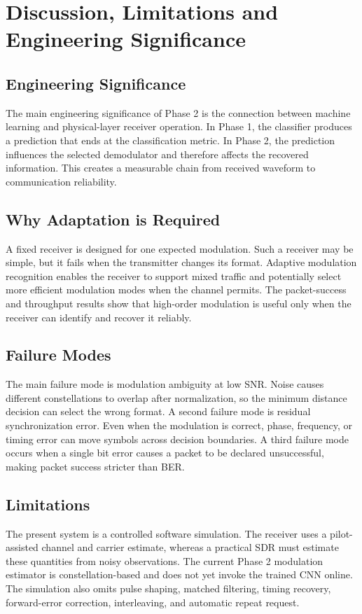 \chapter{Discussion, Limitations and Engineering Significance}

\section{Engineering Significance}
The main engineering significance of Phase 2 is the connection between
machine learning and physical-layer receiver operation. In Phase 1, the
classifier produces a prediction that ends at the classification metric. In
Phase 2, the prediction influences the selected demodulator and therefore
affects the recovered information. This creates a measurable chain from
received waveform to communication reliability.

\section{Why Adaptation is Required}
A fixed receiver is designed for one expected modulation. Such a receiver may
be simple, but it fails when the transmitter changes its format. Adaptive
modulation recognition enables the receiver to support mixed traffic and
potentially select more efficient modulation modes when the channel permits.
The packet-success and throughput results show that high-order modulation is
useful only when the receiver can identify and recover it reliably.

\section{Failure Modes}
The main failure mode is modulation ambiguity at low SNR. Noise causes
different constellations to overlap after normalization, so the minimum
distance decision can select the wrong format. A second failure mode is
residual synchronization error. Even when the modulation is correct, phase,
frequency, or timing error can move symbols across decision boundaries. A
third failure mode occurs when a single bit error causes a packet to be
declared unsuccessful, making packet success stricter than BER.

\section{Limitations}
The present system is a controlled software simulation. The receiver uses a
pilot-assisted channel and carrier estimate, whereas a practical SDR must
estimate these quantities from noisy observations. The current Phase 2
modulation estimator is constellation-based and does not yet invoke the
trained CNN online. The simulation also omits pulse shaping, matched
filtering, timing recovery, forward-error correction, interleaving, and
automatic repeat request.

